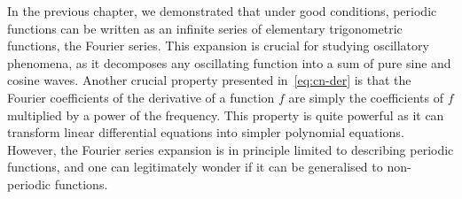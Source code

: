 In the previous chapter, we demonstrated that under good conditions, periodic functions
can be written as an infinite series of elementary trigonometric functions, the Fourier
series. This expansion is crucial for studying oscillatory phenomena, as it decomposes any
oscillating function into a sum of pure sine and cosine waves. Another crucial property
presented in~\cref{eq:cn-der} is that the Fourier coefficients of the derivative of a
function $f$ are simply the coefficients of $f$ multiplied by a power of the frequency.
This property is quite powerful as it can transform linear differential equations into
simpler polynomial equations. However, the Fourier series expansion is in principle
limited to describing periodic functions, and one can legitimately wonder if it can be
generalised to non-periodic functions.

